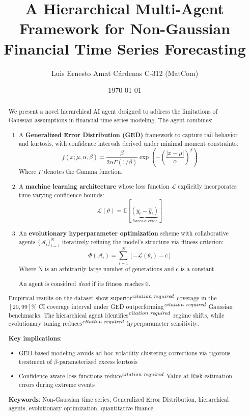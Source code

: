 \documentclass[12pt]{article}
\title{A Hierarchical Multi-Agent Framework for Non-Gaussian Financial Time Series Forecasting}
\author{Luis Ernesto Amat Cárdenas C-312 (MatCom)}
\date{\today}
\begin{document}
\maketitle

\begin{abstract}
We present a novel hierarchical AI agent designed to address the limitations of Gaussian assumptions in financial time series modeling. The agent combines:

\begin{enumerate}
    \item A \textbf{Generalized Error Distribution (GED)} framework to capture tail behavior and kurtosis, with confidence intervals derived under minimal moment constraints:
    \begin{equation*}
        f(x; \mu, \alpha, \beta) = \frac{\beta}{2\alpha\Gamma(1/\beta)} \exp\left(-\left(\frac{|x-\mu|}{\alpha}\right)^\beta\right)
    \end{equation*}
    Where $\Gamma$ denotes the Gamma function.
    
    \item A \textbf{machine learning architecture} whose loss function $\mathscr{L}$ explicitly incorporates time-varying confidence bounds:
    \begin{equation*}
        \mathscr{L}(\theta) = \mathbb{E}\left[ \underbrace{(y_t - \hat{y}_t)}_{\text{forecast error}} \right]
    \end{equation*}
    
    \item An \textbf{evolutionary hyperparameter optimization} scheme with collaborative agents $\{\mathscr{A}_i\}_{i=1}^N$ iteratively refining the model's structure via fitness criterion:
    \begin{equation*}
        \Phi(\mathscr{A}_i) = \sum_{i=1}^N \left[ -\mathscr{L}(\theta_i) - c \right]
    \end{equation*}
    Where N is an arbitrarily large number of generations and c is a constant.

    An agent is considred \emph{dead} if its fitness reaches 0.
\end{enumerate}

    Empirical results on the dataset show superior$^\emph{citation required}$ coverage in the $[20, 99]$\% CI coverage interval under GED outperforming$^\emph{citation required}$ Gaussian benchmarks. The hierarchical agent identifies$^\emph{citation required}$ regime shifts, while evolutionary tuning reduces$^\emph{citation required}$ hyperparameter sensitivity. 

\textbf{Key implications}:
\begin{itemize}
    \item GED-based modeling avoids ad hoc volatility clustering corrections via rigorous treatment of $\beta$-parameterized excess kurtosis
    \item Confidence-aware loss functions reduce$^\emph{citation required}$ Value-at-Risk estimation errors during extreme events
\end{itemize}

\textbf{Keywords}: Non-Gaussian time series, Generalized Error Distribution, hierarchical agents, evolutionary optimization, quantitative finance
\end{abstract}
\end{document}
